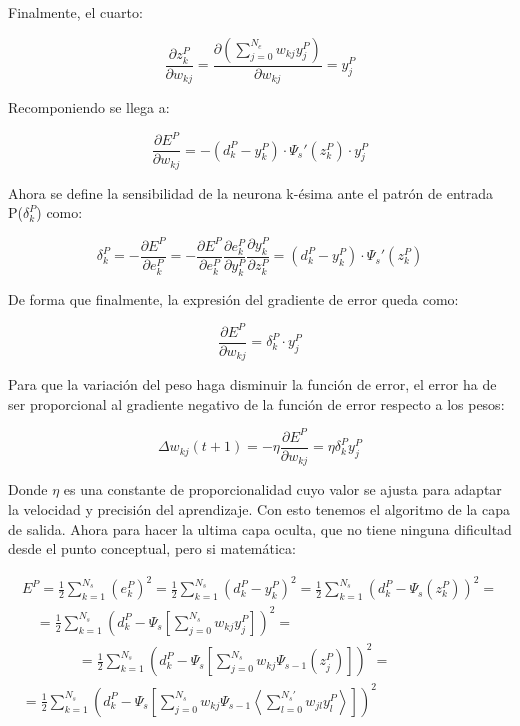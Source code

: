 \documentclass[12pt]{book}
\numberwithin{equation}{section}
\begin{document}
Finalmente, el cuarto:

\begin{equation}
\frac{\partial z^P_k}{\partial w_{kj}}=\frac{\partial \left(\sum_{j=0}^{N_e} w_{kj} y_j^P\right)}{\partial w_{kj}} = y_j^P
\end{equation}

Recomponiendo se llega a:

\begin{equation}
\frac{\partial E^P}{\partial w_{kj}} =
-(d_k^P-y_k^P) \cdot \Psi _s'(z_k^P) \cdot y_j^P
\end{equation}

Ahora se define la sensibilidad de la neurona k-ésima ante el patrón de entrada P($\delta_k^P$) como:

\begin{equation}
\delta _k^P = - \frac{\partial E^P}{\partial e^P_k}=-
\frac{\partial E^P}{\partial e_{k}^P} \frac{\partial e^P_k}{\partial y_{k}^P} \frac{\partial y^P_k}{\partial z_{k}^P} = (d_k^P-y_k^P) \cdot \Psi _s'(z_k^P)
\end{equation}

De forma que finalmente, la expresión del gradiente de error queda como:

\begin{equation}
\frac{\partial E^P}{\partial w_{kj}} = \delta_k^P \cdot y_j^P
\end{equation}

Para que la variación del peso haga disminuir la función de error, el error ha de ser proporcional al gradiente negativo de la función de error respecto a los pesos:

\begin{equation}
\Delta w_{kj}(t+1) = -\eta \frac{\partial E^P}{\partial w_{kj}} = \eta \delta_k^P y_j^P
\end{equation}

Donde $\eta$ es una constante de proporcionalidad cuyo valor se ajusta para adaptar la velocidad y precisión del aprendizaje. Con esto tenemos el algoritmo de la capa de salida. Ahora para hacer la ultima capa oculta, que no tiene ninguna dificultad desde el punto conceptual, pero si matemática:

\begin{multline}
E^P = \frac{1}{2} \sum_{k=1}^{N_s} (e_k^P)^2=\frac{1}{2}\sum_{k=1}^{N_s}(d_k^P-y_k^P)^2 =  \frac{1}{2} \sum_{k=1}^{N_s} \left(d_k^P - \Psi _s(z_k^P)\right)^2 =\\
\quad = \frac{1}{2} \sum_{k=1}^{N_s} \left(d_k^P - \Psi _s \left[ \sum_{j=0}^{N_s} w_{kj} y_j^P\right]\right)^2 = \\
\qquad \qquad = \frac{1}{2} \sum_{k=1}^{N_s} \left(d_k^P - \Psi _s \left[ \sum_{j=0}^{N_s} w_{kj}\Psi _{s-1}(z_j^P)\right]\right)^2 =\\
= \frac{1}{2} \sum_{k=1}^{N_s} \left(d_k^P - \Psi _s \left[ \sum_{j=0}^{N_s} w_{kj}\Psi _{s-1} \left\langle \sum_{l=0}^{N_s'} w_{jl} y_l^P\right\rangle \right] \right)^2
\end{multline}
\end{document}
